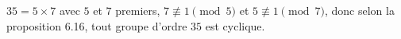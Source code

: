 $35 = 5\times 7$ avec $5$ et $7$ premiers, $7\not\equiv 1\pmod{5}$ et
$5\not\equiv 1\pmod{7}$, donc selon la proposition 6.16, tout groupe d'ordre $35$
est cyclique.
